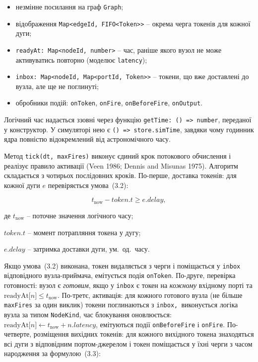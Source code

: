 \documentclass[
]{article}
\begin{document}
\begin{itemize}
\item
  незмінне посилання на граф \texttt{Graph};
\item
  відображення
  \texttt{Map}\texttt{\textless{}}\texttt{edgeId}\texttt{,\ FIFO\textless{}}\texttt{Token}\texttt{\textgreater{}\textgreater{}}
  -- окрема черга токенів для кожної дуги;
\item
  \texttt{readyAt}\texttt{:\ }\texttt{Map}\texttt{\textless{}}\texttt{nodeId}\texttt{,\ }\texttt{number}\texttt{\textgreater{}}
  -- час, раніше якого вузол не може активуватись повторно (моделює
  \texttt{latency});
\item
  \texttt{inbox}\texttt{:\ }\texttt{Map}\texttt{\textless{}}\texttt{nodeId}\texttt{,\ }\texttt{Map}\texttt{\textless{}}\texttt{portId}\texttt{,\ }\texttt{Token}\texttt{\textgreater{}\textgreater{}}
  -- токени, що вже доставлені до вузла, але ще не поглинуті;
\item
  обробники подій: \texttt{onToken}, \texttt{onFire},
  \texttt{onBeforeFire}, \texttt{onOutput}.
\end{itemize}

Логічний час надається ззовні через функцію
\texttt{getTime}\texttt{:\ ()\ =\textgreater{}\ }\texttt{number},
переданої у конструктор. У симуляторі нею є
\texttt{()\ =\textgreater{}\ }\texttt{store.simTime}, завдяки чому
годинник ядра повністю відокремлений від астрономічного часу.

Метод
\texttt{tick}\texttt{(}\texttt{dt}\texttt{,\ }\texttt{maxFires}\texttt{)}
виконує єдиний крок потокового обчислення і реалізує правило активації
(Veen 1986; Dennis and Misunas 1975). Алгоритм складається з чотирьох
послідовних кроків. По-перше, доставка токенів: для кожної дуги \(e\)
перевіряється умова~(3.2):

\begin{equation}
\tag{3.2}\label{eq:token-delivery}
t_{\text{now}} - token.t \geq e.delay,
\end{equation}

де \(t_{\text{now}}\) -- поточне значення логічного часу;

\(token.t\) -- момент потрапляння токена у дугу;

\(e.delay\) -- затримка доставки дуги, ум.~од.~часу.

Якщо умова~(3.2) виконана, токен видаляється з черги і поміщається у \texttt{inbox}
відповідного вузла-приймача, емітується подія \texttt{onToken}. По-друге,
перевірка готовності: вузол є \emph{готовим}, якщо у \texttt{inbox} є
токен на \emph{кожному} вхідному порті та
\(\text{readyAt}\lbrack n\rbrack \leq t_{\text{now}}\). По-третє,
активація: для кожного готового вузла (не більше \texttt{maxFires} за
один виклик) токени поглинаються з \texttt{inbox}\texttt{,\ }виконується
логіка вузла за типом \texttt{NodeKind}, час блокування оновлюється:
\(\text{readyAt}\lbrack n\rbrack \leftarrow t_{\text{now}} + n.latency\),
емітуються події \texttt{onBeforeFire} і \texttt{onFire}. По-четверте,
розміщення вихідних токенів: для кожного вихідного токена знаходяться
всі дуги з відповідним портом-джерелом і токен поміщається у їхні черги
з часом народження за формулою~(3.3):
\end{document}
